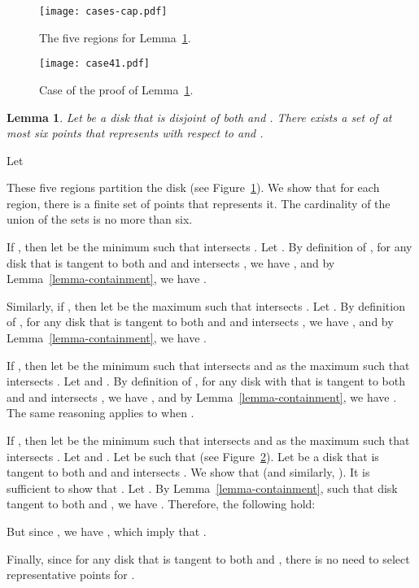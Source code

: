 \documentclass[pdftex,leqno,fleqn,12pt]{article}
\newtheorem{lemma}[theorem]{Lemma}
\newenvironment{proof}{{\textit Proof:} \rm}{\hfill  \medskip\\}
\begin{document}
\begin{figure}
\centering\texttt{[image: cases-cap.pdf]}\caption{The five regions for
Lemma~\ref{lemma-repr}.}\label{fig-lemma-repr}
\end{figure}
\begin{figure}
\centering\texttt{[image: case41.pdf]}\caption{Case  of the proof of
Lemma~\ref{lemma-repr}.}\label{fig-lemma-repr4}
\end{figure}
\begin{lemma}\label{lemma-repr} Let  be a disk that is disjoint of both  and . There exists a
set of at most six points that represents  with respect to  and .
\end{lemma}
\begin{proof} Let

These five regions partition the disk  (see Figure~\ref{fig-lemma-repr}). We show that for each
region, there is a finite set of points that represents it. The cardinality of the union of the
sets is no more than six.

If , then let  be the minimum  such that  intersects . Let
. By definition of , for any disk  that is tangent to both  and 
and intersects , we have , and by Lemma~\ref{lemma-containment}, we have .

Similarly, if , then let  be the maximum  such that  intersects
. Let . By definition of , for any disk  that is tangent to both 
and  and intersects , we have , and by Lemma~\ref{lemma-containment}, we have
.

If , then let  be the minimum  such that  intersects  and
 as the maximum  such that  intersects . Let  and
. By definition of , for any disk  with  that is tangent to both
 and  and intersects , we have , and by Lemma~\ref{lemma-containment}, we
have . The same reasoning applies to  when .

If , then let  be the minimum  such that  intersects  and
 as the maximum  such that  intersects . Let  and . Let  be such that  (see Figure~\ref{fig-lemma-repr4}).
Let  be a disk that is tangent to both  and
 and intersects . We show that  (and similarly, ). It is sufficient to show that . Let . By Lemma~\ref{lemma-containment},  such
that  disk  tangent to both  and , we have . Therefore, the following hold:

But since , we have , which imply that .

Finally, since  for any disk  that is tangent to both  and , there is no
need to select representative points for .
\end{proof}
\end{document}
